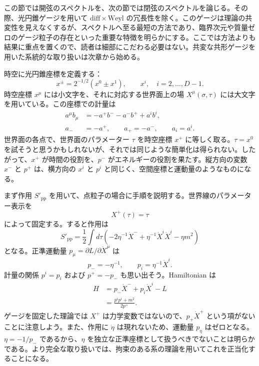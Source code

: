\label{sec:1.3}

この節では開弦のスペクトルを、次の節では閉弦のスペクトルを論じる。その際、光円錐ゲージを用いて $\mathrm{diff}\times\mathrm{Weyl}$ の冗長性を除く。このゲージは理論の共変性を見えなくするが、スペクトルへ至る最短の方法であり、臨界次元や質量ゼロのゲージ粒子の存在といった重要な特徴を明らかにする。ここでは方法よりも結果に重点を置くので、読者は細部にこだわる必要はない。共変な共形ゲージを用いた系統的な取り扱いは次章から始める。

時空に光円錐座標を定義する：
\begin{equation}
x^\pm=2^{-1/2}(x^0\pm x^1),\qquad x^i,\quad i=2,\ldots,D-1.
\tag{1.3.1}\label{eq:1.3.1}
\end{equation}
時空座標 $x^\mu$ には小文字を、それに対応する世界面上の場 $X^\mu(\sigma,\tau)$ には大文字を用いている。この座標での計量は
\begin{align}
a^\mu b_\mu&=-a^+b^- -a^-b^+ +a^ib^i,
\tag{1.3.2a}\label{eq:1.3.2a}\\
a_-&=-a^+,\qquad a_+=-a^-,\qquad a_i=a^i.
\tag{1.3.2b}\label{eq:1.3.2b}
\end{align}
世界面の各点で、世界面のパラメーター $\tau$ を時空座標 $x^+$ に等しく取る。$\tau=x^0$ を試そうと思うかもしれないが、それでは同じような簡単化は得られない。したがって、$x^+$ が時間の役割を、$p^-$ がエネルギーの役割を果たす。縦方向の変数 $x^-$ と $p^+$ は、横方向の $x^i$ と $p^i$ と同じく、空間座標と運動量のようなものになる。

まず作用 $S'_{\mathrm{pp}}$ を用いて、点粒子の場合に手順を説明する。世界線のパラメーター表示を
\begin{equation}
X^+(\tau)=\tau
\tag{1.3.3}\label{eq:1.3.3}
\end{equation}
によって固定する。すると作用は
\begin{equation}
S'_{\mathrm{pp}}=\frac12\int d\tau
\left(-2\eta^{-1}\dot X^-+\eta^{-1}\dot X^i\dot X^i-\eta m^2\right)
\tag{1.3.4}\label{eq:1.3.4}
\end{equation}
となる。正準運動量 $p_\mu=\partial L/\partial\dot X^\mu$ は
\begin{equation}
p_-=-\eta^{-1},\qquad p_i=\eta^{-1}\dot X^i.
\tag{1.3.5}\label{eq:1.3.5}
\end{equation}
計量の関係 $p^i=p_i$ および $p^+=-p_-$ も思い出そう。Hamiltonian は
\begin{equation}
\begin{aligned}
H&=p_-\dot X^-+p_i\dot X^i-L\\
 &=\frac{p^ip^i+m^2}{2p^+}.
\end{aligned}
\tag{1.3.6}\label{eq:1.3.6}
\end{equation}
ゲージを固定した理論では $X^+$ は力学変数ではないので、$p_+\dot X^+$ という項がないことに注意しよう。また、作用に $\dot\eta$ は現れないため、運動量 $p_\eta$ はゼロとなる。$\eta=-1/p_-$ であるから、$\eta$ を独立な正準座標として扱うべきでないことは明らかである。より完全な取り扱いでは、拘束のある系の理論を用いてこれを正当化することになる。

